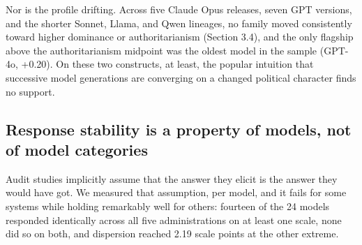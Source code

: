 \documentclass[
]{article}
\newcounter{none} %
\begin{document}
Nor is the profile drifting. Across five Claude Opus releases, seven GPT
versions, and the shorter Sonnet, Llama, and Qwen lineages, no family
moved consistently toward higher dominance or authoritarianism (Section
3.4), and the only flagship above the authoritarianism midpoint was the
oldest model in the sample (GPT-4o, +0.20). On these two constructs, at
least, the popular intuition that successive model generations are
converging on a changed political character finds no support.

\subsection{Response stability is a property of models, not of model
categories}\label{response-stability-is-a-property-of-models-not-of-model-categories}

Audit studies implicitly assume that the answer they elicit is the
answer they would have got. We measured that assumption, per model, and
it fails for some systems while holding remarkably well for others:
fourteen of the 24 models responded identically across all five
administrations on at least one scale, none did so on both, and
dispersion reached 2.19 scale points at the other extreme.
\end{document}
